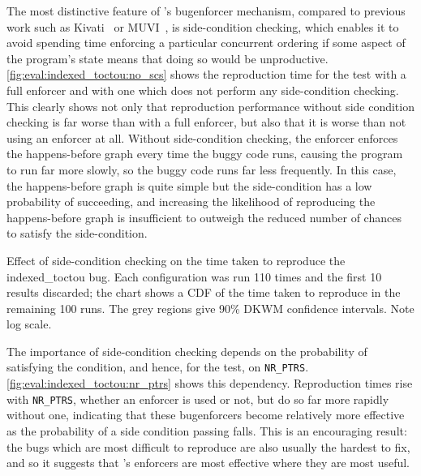 The most distinctive feature of {\technique}'s \gls{bugenforcer}
mechanism, compared to previous work such as Kivati~\cite{Chew2010} or
MUVI~\cite{Lu2007}, is side-condition checking, which enables it to
avoid spending time enforcing a particular concurrent ordering if some
aspect of the program's state means that doing so would be
unproductive.  \autoref{fig:eval:indexed_toctou:no_scs} shows the
reproduction time for the  test with a full enforcer
and with one which does not perform any side-condition checking.  This
clearly shows not only that reproduction performance without side
condition checking is far worse than with a full enforcer, but also
that it is worse than not using an enforcer at all.  Without
side-condition checking, the enforcer enforces the happens-before
graph every time the buggy code runs, causing the program to run far
more slowly, so the buggy code runs far less frequently.  In this
case, the happens-before graph is quite simple but the side-condition
has a low probability of succeeding, and increasing the likelihood of
reproducing the happens-before graph is insufficient to outweigh the
reduced number of chances to satisfy the
side-condition.

\begin{sanefig}
  \caption{Effect of side-condition checking on the time taken to
    reproduce the indexed\_toctou bug.  Each configuration was run 110
    times and the first 10 results discarded; the chart shows a CDF of
    the time taken to reproduce in the remaining 100 runs.  The grey
    regions give 90\% DKWM confidence intervals.  Note log scale.}
  \label{fig:eval:indexed_toctou:no_scs}
\end{sanefig}

The importance of side-condition checking depends on the probability
of satisfying the condition, and hence, for the  test,
on \texttt{NR\_PTRS}.  \autoref{fig:eval:indexed_toctou:nr_ptrs} shows
this dependency.  Reproduction times rise with \texttt{NR\_PTRS},
whether an enforcer is used or not, but do so far more rapidly without
one, indicating that these \glspl{bugenforcer} become relatively more
effective as the probability of a side condition passing falls.  This
is an encouraging result: the bugs which are most difficult to
reproduce are also usually the hardest to fix, and so it suggests that
{\technique}'s enforcers are most effective where they are most
useful.

